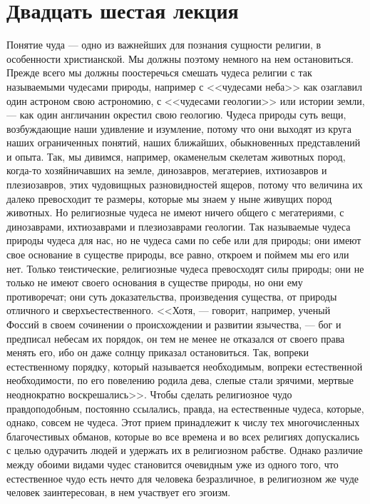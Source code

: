 \documentclass[12pt]{article}
\begin{document}
{}
\section*{Двадцать шестая лекция}

Понятие чуда --- одно из важнейших для познания сущности религии, в особенности христианской. Мы должны поэтому немного на нем остановиться. Прежде всего мы должны поостеречься смешать чудеса религии с так называемыми чудесами природы, например с <<чудесами неба>>  как озаглавил один астроном свою астрономию, с <<чудесами геологии>>  или истории земли, --- как один англичанин окрестил свою геологию. Чудеса природы суть вещи, возбуждающие наши удивление и изумление, потому что они выходят из круга наших ограниченных понятий, наших ближайших, обыкновенных представлений и опыта. Так, мы дивимся, например, окаменелым скелетам животных пород, когда-то хозяйничавших на земле, динозавров, мегатериев, ихтиозавров и плезиозавров, этих чудовищных разновидностей ящеров, потому что величина их далеко превосходит те размеры, которые мы знаем у ныне живущих пород животных. Но религиозные чудеса не имеют ничего общего с мегатериями, с динозаврами, ихтиозаврами и плезиозаврами геологии. Так называемые чудеса природы чудеса для нас, но не чудеса сами по себе или для природы; они имеют свое основание в существе природы, все равно, откроем и поймем мы его или нет. Только теистические, религиозные чудеса превосходят силы природы; они не только не имеют своего основания в существе природы, но они ему противоречат; они суть доказательства, произведения существа, от природы отличного и сверхъестественного. <<Хотя, --- говорит, например, ученый Фоссий в своем сочинении о происхождении и развитии язычества, --- бог и предписал небесам их порядок, он тем не менее не отказался от своего права менять его, ибо он даже солнцу приказал остановиться. Так, вопреки естественному порядку, который называется необходимым, вопреки естественной необходимости, по его повелению родила дева, слепые стали зрячими, мертвые неоднократно воскрешались>>. Чтобы сделать религиозное чудо правдоподобным, постоянно ссылались, правда, на естественные чудеса, которые, однако, совсем не чудеса. Этот прием принадлежит к числу тех многочисленных благочестивых обманов, которые во все времена и во всех религиях допускались с целью одурачить людей и удержать их в религиозном рабстве. Однако различие между обоими видами чудес становится очевидным уже из одного того, что естественное чудо есть нечто для человека безразличное, в религиозном же чуде человек заинтересован, в нем участвует его эгоизм. 
\end{document}
